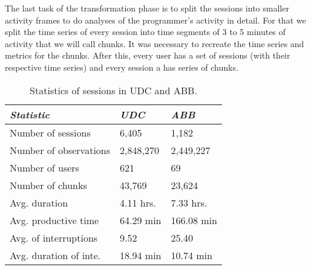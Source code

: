 The last task of the transformation phase is to split the sessions into smaller activity frames to do analyses of the programmer's activity in detail. For that we split the time series of every session into time segments of 3 to 5 minutes of activity that we will call chunks. It was necessary to recreate the time series and metrics for the chunks. After this, every user has a set of sessions (with their respective time series) and every session a has series of chunks.

\begin{table}[ht!]
	\small
	\caption{Statistics of sessions in UDC and ABB. }
	\label{tbl:stats_sessions}
	\centering
	\begin{tabular}{p{3.5cm}|p{2cm}|p{2cm}} 
		\hline
		\emph{Statistic} & \emph{UDC} & \emph{ABB} \\
		\hline
		\hline
		Number of sessions & 6,405 & 1,182 \\
		\hline
		Number of observations & 2,848,270 & 2,449,227 \\
		\hline
		Number of users & 621 & 69 \\
		\hline
		Number of chunks & 43,769 & 23,624 \\
		\hline
		Avg. duration & 4.11 hrs. & 7.33 hrs. \\
		\hline
		Avg. productive time & 64.29 min & 166.08 min \\
		\hline
		Avg. of interruptions & 9.52 & 25.40 \\
		\hline
		Avg. duration of inte. & 18.94 min & 10.74 min \\
		\hline
	\end{tabular}
\end{table}
